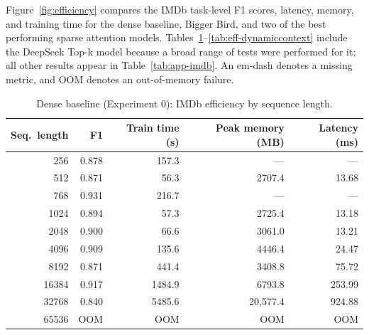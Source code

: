\documentclass[11pt]{article}
\begin{document}
Figure~\ref{fig:efficiency} compares the IMDb task-level F1 scores, latency, memory, and training time for the dense baseline, Bigger Bird, and two of the best performing sparse attention models. Tables~\ref{tab:eff-baseline}--\ref{tab:eff-dynamiccontext} include the DeepSeek Top-k model because a broad range of tests were performed for it; all
other results appear in Table~\ref{tab:app-imdb}. An em-dash denotes a missing
metric, and OOM denotes an out-of-memory failure.

\begin{table}[ht]
  \centering
  \small
  \caption{Dense baseline (Experiment 0): IMDb efficiency by sequence length.}
  \label{tab:eff-baseline}
  \begin{tabular}{@{}rrrrr@{}}
    \toprule
    Seq.\ length & F1 & Train time (s) & Peak memory (MB) & Latency (ms) \\
    \midrule
    256    & 0.878 & 157.3   & ---      & ---   \\
    512    & 0.871 & 56.3    & 2707.4   & 13.68 \\
    768    & 0.931 & 216.7   & ---      & ---   \\
    1024   & 0.894 & 57.3    & 2725.4   & 13.18 \\
    2048   & 0.900 & 66.6    & 3061.0   & 13.21 \\
    4096   & 0.909 & 135.6   & 4446.4   & 24.47 \\
    8192   & 0.871 & 441.4   & 3408.8   & 75.72 \\
    16384  & 0.917 & 1484.9  & 6793.8   & 253.99 \\
    32768  & 0.840 & 5485.6  & 20{,}577.4 & 924.88 \\
    65536  & OOM   & OOM     & OOM      & OOM   \\
    \bottomrule
  \end{tabular}
\end{table}
\end{document}
